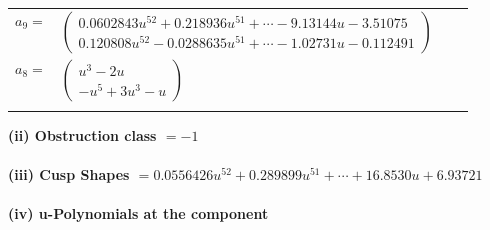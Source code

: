 \documentclass[1p]{elsarticle_modified}
\theoremstyle{definition}
\begin{document}
\begin{tabular}{m{7pt} m{180pt} m{7pt} m{180pt} }
\flushright $a_{9}=$&$\begin{pmatrix}0.0602843 u^{52}+0.218936 u^{51}+\cdots-9.13144 u-3.51075\\0.120808 u^{52}-0.0288635 u^{51}+\cdots-1.02731 u-0.112491\end{pmatrix}$ \\
\flushright $a_{8}=$&$\begin{pmatrix}u^3-2 u\\- u^5+3 u^3- u\end{pmatrix}$\\&\end{tabular}
\flushleft \textbf{(ii) Obstruction class $= -1$}\\~\\
\flushleft \textbf{(iii) Cusp Shapes $= 0.0556426 u^{52}+0.289899 u^{51}+\cdots+16.8530 u+6.93721$}\\~\\
\newpage\renewcommand{\arraystretch}{1}
\flushleft \textbf{(iv) u-Polynomials at the component}\newline \\
\end{document}
